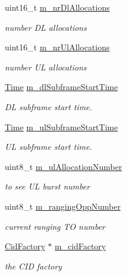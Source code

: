 \begin{DoxyCompactItemize}
uint16\+\_\+t \hyperlink{classns3_1_1BaseStationNetDevice_aef0a8f41aa4e1805c33eb3e5715e672e}{m\+\_\+nr\+Dl\+Allocations}
\begin{DoxyCompactList}\small\item\em number DL allocations \end{DoxyCompactList}\item 
uint16\+\_\+t \hyperlink{classns3_1_1BaseStationNetDevice_a6853f9cb3242aae594b34665d64b9f34}{m\+\_\+nr\+Ul\+Allocations}
\begin{DoxyCompactList}\small\item\em number UL allocations \end{DoxyCompactList}\item 
\hyperlink{classns3_1_1Time}{Time} \hyperlink{classns3_1_1BaseStationNetDevice_aecc2370e0c06f99de4cc08cee2950b06}{m\+\_\+dl\+Subframe\+Start\+Time}
\begin{DoxyCompactList}\small\item\em DL subframe start time. \end{DoxyCompactList}\item 
\hyperlink{classns3_1_1Time}{Time} \hyperlink{classns3_1_1BaseStationNetDevice_a2053e58ada689af75ffd4d8fd4ca97fb}{m\+\_\+ul\+Subframe\+Start\+Time}
\begin{DoxyCompactList}\small\item\em UL subframe start time. \end{DoxyCompactList}\item 
uint8\+\_\+t \hyperlink{classns3_1_1BaseStationNetDevice_a8970c1e5d74da526640fb81a4ca173e4}{m\+\_\+ul\+Allocation\+Number}
\begin{DoxyCompactList}\small\item\em to see UL burst number \end{DoxyCompactList}\item 
uint8\+\_\+t \hyperlink{classns3_1_1BaseStationNetDevice_a437680ebe008a91f16afc598346a624a}{m\+\_\+ranging\+Opp\+Number}
\begin{DoxyCompactList}\small\item\em current ranging TO number \end{DoxyCompactList}\item 
\hyperlink{classns3_1_1CidFactory}{Cid\+Factory} $\ast$ \hyperlink{classns3_1_1BaseStationNetDevice_a40be478b4658b283435187caccba30ff}{m\+\_\+cid\+Factory}
\begin{DoxyCompactList}\small\item\em the C\+ID factory \end{DoxyCompactList}\item 

\end{DoxyCompactItemize}
